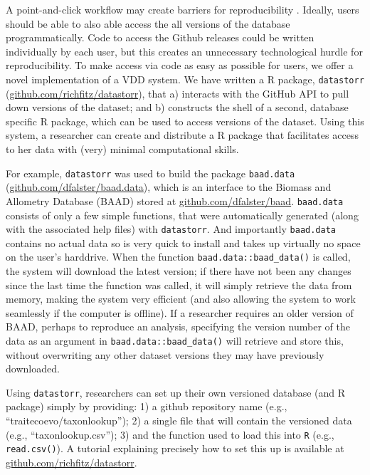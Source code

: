 \documentclass[a4paper,11pt]{article}
\newcommand{\smurl}[1]{{\footnotesize\url{#1}}}
\begin{document}
A point-and-click workflow may create barriers for reproducibility \cite{Wilson-2014,Lowndes-2017}. Ideally, users should be able to also able access the all versions of the database programmatically. Code to access the Github releases could be written individually by each user, but this creates an unnecessary technological hurdle for reproducibility.  To make access via code as easy as possible for users, we offer a novel implementation of a VDD system. We have written a R package, \texttt{datastorr} (\smurl{github.com/richfitz/datastorr}), that a) interacts with the GitHub API to pull down versions of the dataset; and b) constructs the shell of a second, database specific R package, which can be used to access versions of the dataset. Using this system, a researcher can create and distribute a R package that facilitates access to her data with (very) minimal computational skills.

For example, \texttt{datastorr} was used to build the package \texttt{baad.data} (\smurl{github.com/dfalster/baad.data}), which is an interface to the Biomass and Allometry Database (BAAD) stored at \smurl{github.com/dfalster/baad}. \texttt{baad.data} consists of only a few simple functions, that were automatically generated (along with the associated help files) with \texttt{datastorr}. And importantly \texttt{baad.data} contains no actual data so is very quick to install and takes up virtually no space on the user's harddrive. When the function \texttt{baad.data::baad\_data()} is called, the system will download the latest version; if there have not been any changes since the last time the function was called, it will simply retrieve the data from memory, making the system very efficient (and also allowing the system to work seamlessly if the computer is offline). If a researcher requires an older version of BAAD, perhaps to reproduce an analysis, specifying the version number of the data as an argument in \texttt{baad.data::baad\_data()} will retrieve and store this, without overwriting any other dataset versions they may have previously downloaded.

Using \texttt{datastorr}, researchers can set up their own versioned database (and R package) simply by providing: 1) a github repository name (e.g., ``traitecoevo/taxonlookup''); 2) a single file that will contain the versioned data (e.g., ``taxonlookup.csv''); 3) and the function used to load this into \texttt{R} (e.g., \texttt{read.csv()}). A tutorial explaining precisely how to set this up is available at \smurl{github.com/richfitz/datastorr}. %
\end{document}
